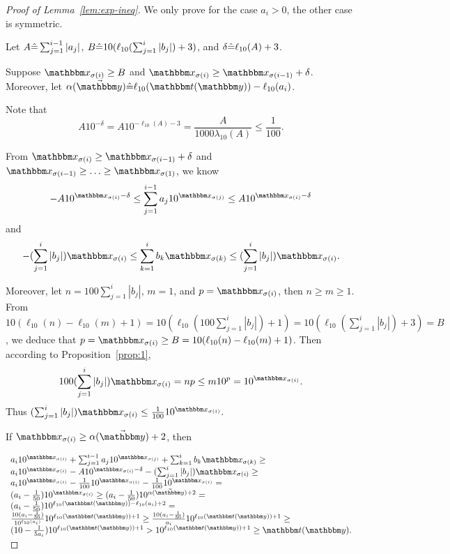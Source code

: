 \begin{proof}[Proof of Lemma~\ref{lem:exp-ineq}]
We only prove for the case $a_i > 0$, the other case is symmetric. 


Let $A\hat{=} \sum_{j=1}^{i-1}|a_j|$, $B \hat{=} 10(\ell_{10}(\sum_{j=1}^{i}|b_j|)+3)$, and $\delta\hat{=}  \ell_{10}(A)+3$. 

Suppose $\ivarx_{\sigma(i)} \ge B$ and $\ivarx_{\sigma(i)} \ge \ivarx_{\sigma(i-1)} + \delta$. Moreover, let $\alpha(\vec{\ivary}) \Def  \ell_{10}(\iterm(\ivary))- \ell_{10}(a_i)$.

Note that
 \begin{equation} 
   A10^{-\delta} =A 10^{-\ell_{10}(A)-3} = \frac{A}{1000\lambda_{10}(A)} \le \frac{1}{100}.   \label{eq:thm-ineq-1}
 \end{equation}
 
 From $\ivarx_{\sigma(i)} \ge \ivarx_{\sigma(i-1)} + \delta$ and $\ivarx_{\sigma(i-1)} \ge \ldots \ge \ivarx_{\sigma(1)}$, 
we know   
$$-A 10^{\ivarx_{\sigma(i)} - \delta} \le  \sum_{j=1}^{i-1} a_j 10^{\ivarx_{\sigma(j)}} \le A 10^{\ivarx_{\sigma(i)} - \delta}$$
and
$$-(\sum_{j=1}^{i}|b_j|) \ivarx_{\sigma(i)} \le \sum_{k=1}^{i} b_k \ivarx_{\sigma(k)} \le (\sum_{j=1}^{i}|b_j|) \ivarx_{\sigma(i)}.$$ 

Moreover, let $n = 100\sum_{j=1}^{i}|b_j|$, $m = 1$, and $p = \ivarx_{\sigma(i)}$, then 
$n \ge m \ge 1$. From $10(\ell_{10}(n)- \ell_{10}(m)+1) = 10 (\ell_{10}(100 \sum_{j=1}^{i}|b_j|) + 1) = 10 (\ell_{10}(\sum_{j=1}^{i}|b_j|) + 3) = B$, we deduce that $p = \ivarx_{\sigma(i)} \ge B = 10(\ell_{10}(n)- \ell_{10}(m)+1)$.
Then according to Proposition~\ref{prop:1}, 
$$100(\sum_{j=1}^{i}|b_j|)\ivarx_{\sigma(i)} = np \le m 10^p = 10^{\ivarx_{\sigma(i)}}.$$
Thus 
$(\sum_{j=1}^{i}|b_j|)\ivarx_{\sigma(i)}  \le \frac{1}{100} 10^{\ivarx_{\sigma(i)}}.$


If $\ivarx_{\sigma(i)} \ge   \alpha(\vec{\ivary}) + 2$, then 

$
\begin{array}{l}
a_i 10^{\ivarx_{\sigma(i)}}+\sum_{j=1}^{i-1} a_j 10^{\ivarx_{\sigma(j)}} + \sum_{k=1}^{i}b_k \ivarx_{\sigma(k)} \ge \\
a_i 10^{\ivarx_{\sigma(i)}} - A 10^{\ivarx_{\sigma(i)} - \delta} - (\sum_{j=1}^{i}|b_j|) \ivarx_{\sigma(i)}  \ge \\
a_i 10^{\ivarx_{\sigma(i)}} - \frac{1}{100}10^{\ivarx_{\sigma(i)}} - \frac{1}{100} 10^{\ivarx_{\sigma(i)}} = \\
(a_i - \frac{1}{50}) 10^{\ivarx_{\sigma(i)}} \ge (a_i - \frac{1}{50}) 10^{ \alpha(\vec{\ivary}) + 2} = \\
(a_i - \frac{1}{50}) 10^{  \ell_{10}(\iterm(\ivary))- \ell_{10}(a_i) + 2} = \\
\frac{10(a_i - \frac{1}{50})}{10^{\ell_{10}(a_i)} } 10^{ \ell_{10}(\iterm(\ivary))+1} \ge \frac{10(a_i - \frac{1}{50})} {a_i} 10^{ \ell_{10}(\iterm(\ivary))+1} \ge \\
(10 - \frac{1}{5a_i}) 10^{ \ell_{10}(\iterm(\ivary))+1} > 10^{ \ell_{10}(\iterm(\ivary))+1} \ge \iterm(\ivary).
\end{array}
$


\end{proof}
